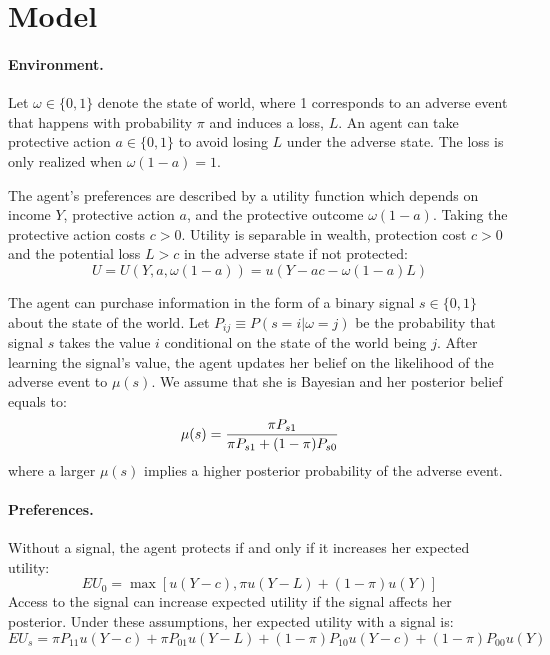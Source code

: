 \documentclass[12pt,a4paper]{article}
\begin{document}
\vspace{20pt}
\section{Model}
\paragraph{Environment.} Let $\omega \in \{0,1\}$ denote the state of world, where 1 corresponds to an adverse event that happens with probability $\pi$ and induces a loss, $L$. An agent can take protective action $a\in\{0,1\}$ to avoid losing $L$ under the adverse state. The loss is only realized when $\omega(1-a)=1$.

The agent's preferences are described by a utility function which depends on income $Y$, protective action $a$, and the protective outcome $\omega(1-a)$. Taking the protective action costs $c>0$. Utility is separable in wealth, protection cost $c>0$ and the potential loss $L>c$ in the adverse state if not protected:
\[
U=U(Y,a,\omega(1-a))=u(Y-ac-\omega(1-a)L)
\]

The agent can purchase information in the form of a binary signal $s\in\{0,1\}$ about the state of the world. Let $P_{ij}\equiv P(s=i|\omega=j)$ be the probability that signal $s$ takes the value $i$ conditional on the state of the world being $j$.  After learning the signal's value, the agent updates her belief on the likelihood of the adverse event to $\mu(s)$. We assume that she is Bayesian and her posterior belief equals to:
\[
\mu(s)= {\pi P_{s1} \over \pi P_{s1}+(1-\pi)P_{s0}}
\]
where a larger $\mu(s)$ implies a higher posterior probability of the adverse event.

\vspace{10pt}
\paragraph{Preferences.} Without a signal, the agent protects if and only if it increases her expected utility:
\[
EU_0=\max[u(Y-c),\pi u(Y-L)+(1-\pi) u(Y)]
\]
Access to the signal can increase expected utility if the signal affects her posterior. Under these assumptions, her expected utility with a signal is:
\[
EU_s=\pi P_{11}u(Y-c)+\pi P_{01}u(Y-L)+(1-\pi)P_{10}u(Y-c)+(1-\pi)P_{00}u(Y)
\]
\end{document}
